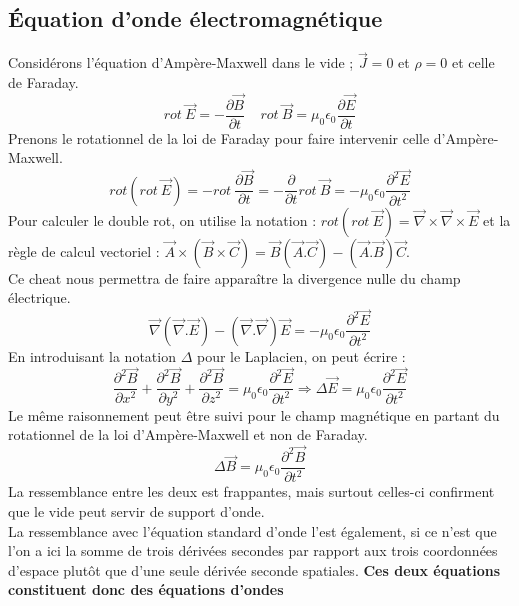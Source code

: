 \documentclass	[11pt, a4paper, openany]{book}
\begin{document}
		\subsection{Équation d'onde électromagnétique}
		Considérons l'équation d'Ampère-Maxwell dans le vide ; $\vec{J} = 0$ et $\rho = 0$ et celle de Faraday.
		\begin{equation}
			rot\ \vec{E} = -\frac{\partial\vec{B}}{\partial t}\ \ \ \ \ rot\ \vec{B} = \mu_0\epsilon_0\frac{\partial\vec{E}}{\partial t}
		\end{equation}
		Prenons le rotationnel de la loi de Faraday pour faire intervenir celle d'Ampère-Maxwell.
		\begin{equation}
			rot(rot\ \vec{E}) = -rot\ \frac{\partial \vec{B}}{\partial t} = -\frac{\partial}{\partial t} rot\ \vec{B} = -\mu_0\epsilon_0\frac{\partial^2\vec{E}}{\partial t^2}
		\end{equation}
		Pour calculer le double rot, on utilise la notation : $rot(rot\ \vec{E}) = \vec{\nabla}\times\vec{\nabla}\times
		\vec{E}$ et la règle de calcul vectoriel : $\vec{A}\times(\vec{B}\times\vec{C}) = \vec{B}(\vec{A}.\vec{C}) - (\vec{A}.\vec{B})\vec{C}$.\\
		Ce cheat nous permettra de faire apparaître la divergence nulle du champ électrique.
		\begin{equation}
			\vec{\nabla}(\vec{\nabla}.\vec{E}) - (\vec{\nabla}.\vec{\nabla})\vec{E} = -\mu_0\epsilon_0\frac{\partial^2\vec{E}}{\partial t^2}
		\end{equation}
		En introduisant la notation $\Delta$ pour le Laplacien, on peut écrire : 
		\begin{equation}
			\frac{\partial^2\vec{B}}{\partial x^2} + \frac{\partial^2\vec{B}}{\partial y^2} + \frac{\partial^2\vec{B}}{\partial z^2} = \mu_0\epsilon_0\frac{\partial^2\vec{E}}{\partial t^2} \Rightarrow \Delta\vec{E} = \mu_0\epsilon_0\frac{\partial^2\vec{E}}{\partial t^2}
		\end{equation}
		Le même raisonnement peut être suivi pour le champ magnétique en partant du rotationnel de la loi d'Ampère-Maxwell et non de Faraday.
		\begin{equation}
			\Delta\vec{B} = \mu_0\epsilon_0\frac{\partial^2\vec{B}}{\partial t^2}
		\end{equation}
		La ressemblance entre les deux est frappantes, mais surtout celles-ci confirment que le vide peut servir de support d'onde.\\
		La ressemblance avec l'équation standard d'onde l'est également, si ce n'est que l'on a ici la somme de trois dérivées secondes par rapport aux trois coordonnées d'espace plutôt que d'une seule dérivée seconde spatiales. \textbf{Ces deux équations constituent donc des équations d'ondes}
		
\end{document}
